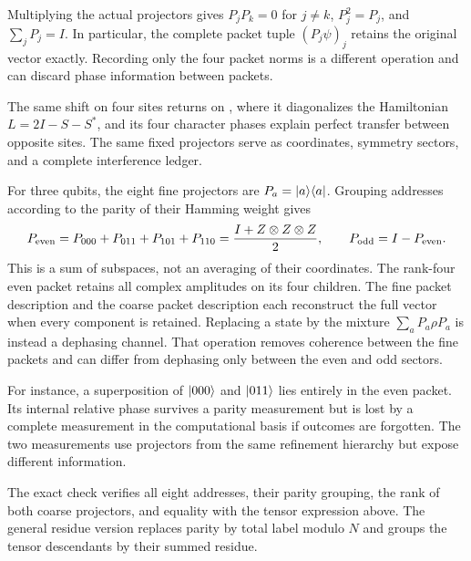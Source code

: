 Multiplying the actual projectors gives $P_jP_k=0$ for $j\ne k$, $P_j^2=P_j$, and $\sum_jP_j=I$. In particular, the complete packet tuple $(P_j\psi)_j$ retains the original vector exactly. Recording only the four packet norms is a different operation and can discard phase information between packets.

The same shift on four sites returns on , where it diagonalizes the Hamiltonian $L=2I-S-S^*$, and its four character phases explain perfect transfer between opposite sites. The same fixed projectors serve as coordinates, symmetry sectors, and a complete interference ledger.

For three qubits, the eight fine projectors are $P_a=\lvert a\rangle\langle a\rvert$. Grouping addresses according to the parity of their Hamming weight gives
\[
P_{\rm even}=P_{000}+P_{011}+P_{101}+P_{110}
=\frac{I+Z\otimes Z\otimes Z}{2},
\qquad P_{\rm odd}=I-P_{\rm even}.
\]
This is a sum of subspaces, not an averaging of their coordinates. The rank-four even packet retains all complex amplitudes on its four children.
The fine packet description and the coarse packet description each reconstruct the full vector when every component is retained. Replacing a state by the mixture $\sum_aP_a\rho P_a$ is instead a dephasing channel. That operation removes coherence between the fine packets and can differ from dephasing only between the even and odd sectors.

For instance, a superposition of $\lvert 000\rangle$ and $\lvert 011\rangle$ lies entirely in the even packet. Its internal relative phase survives a parity measurement but is lost by a complete measurement in the computational basis if outcomes are forgotten. The two measurements use projectors from the same refinement hierarchy but expose different information.

The exact check verifies all eight addresses, their parity grouping, the rank of both coarse projectors, and equality with the tensor expression above. The general residue version replaces parity by total label modulo $N$ and groups the tensor descendants by their summed residue.

